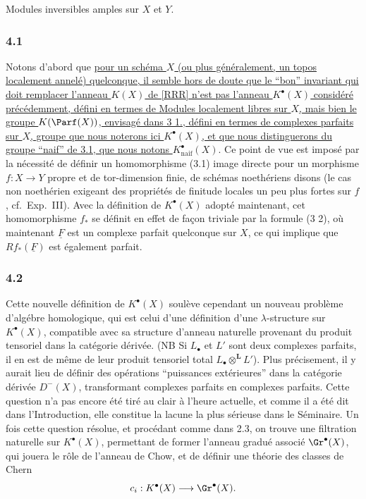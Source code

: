 Modules inversibles amples sur $X$ et $Y$.

\subsubsection*{4.1}
Notons d'abord que \uline{pour un sch\'ema $X$ (ou plus g\'en\'eralement, un topos localement annel\'e) quelconque, il semble hors de doute que le ``bon'' invariant qui doit remplacer l'anneau $K(X)$ de [RRR] n'est pas l'anneau $K^\bullet(X)$ consid\'er\'e pr\'ec\'edemment, d\'efini en termes de Modules localement libres sur $X$, mais bien le groupe $K(\Parf(X))$, envisag\'e dans 3 1., d\'efini en termes de complexes parfaits sur $X$, groupe que nous noterons ici $K^\bullet(X)$, et que nous distinguerons du groupe ``naif'' de 3.1, que nous notons $K^\bullet_{\mathrm{naif}}(X)$}. Ce point de vue est impos\'e par la n\'ecessit\'e de d\'efinir un homomorphisme (3.1) image directe pour un morphisme $f:X\to Y$ propre et de tor-dimension finie, de sch\'emas noeth\'eriens disons (le cas non noeth\'erien exigeant des propri\'et\'es de finitude locales un peu plus fortes sur $f$, cf.\ Exp.\ III). Avec la d\'efinition de $K^\bullet(X)$ adopt\'e maintenant, cet homomorphisme $f_*$ se d\'efinit en effet de fa\c{c}on triviale par la formule (3 2), o\`u maintenant $\underline F$ est un complexe parfait quelconque sur $X$, ce qui implique que $Rf_*(\underline F)$ est \'egalement parfait.

\subsubsection*{4.2}
Cette nouvelle d\'efinition de $K^\bullet(X)$ soul\`eve cependant un nouveau probl\`eme d'alg\'ebre homologique, qui est celui d'une d\'efinition d'une $\lambda$-structure sur $K^\bullet(X)$, compatible avec sa structure d'anneau naturelle provenant du produit tensoriel dans la cat\'egorie d\'eriv\'ee. (NB Si $L_\bullet$ et $L'$ sont deux complexes parfaits, il en est de m\^eme de leur produit tensoriel total $L_\bullet\otimes^{\mathbf L}L'$). Plus pr\'ecisement, il y aurait lieu de d\'efinir des op\'erations ``puissances ext\'erieures'' dans la cat\'egorie d\'eriv\'ee $D^-(X)$, transformant complexes parfaits en complexes parfaits. Cette question n'a pas encore \'et\'e tir\'e au clair \`a l'heure actuelle, et comme il a \'et\'e dit dans l'Introduction, elle constitue la lacune la plus s\'erieuse dans le S\'eminaire. Un fois cette question r\'esolue, et proc\'edant comme dans 2.3, on trouve une filtration naturelle sur $K^\bullet(X)$, permettant de former l'anneau gradu\'e associ\'e $\Gr^\bullet(X)$, qui jouera le r\^ole de l'anneau de Chow, et de d\'efinir une th\'eorie des classes de Chern
\[
c_i:K^\bullet(X)\longrightarrow \Gr^\bullet(X).
\]


